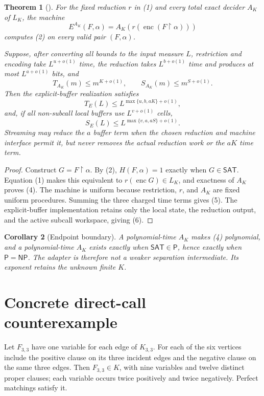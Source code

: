 \documentclass[11pt]{article}
\newtheorem{theorem}{Theorem}
\newtheorem{corollary}[theorem]{Corollary}
\newcommand{\SAT}{\mathsf{SAT}}
\newcommand{\Pclass}{\mathsf P}
\newcommand{\NPclass}{\mathsf{NP}}
\newcommand{\claim}[1]{\texttt{\detokenize{#1}}}
\begin{document}
\begin{theorem}[\claim{CORE-RESIDUAL-ADAPTER1}]
For the fixed reduction \(r\) in (1) and every total exact decider \(A_K\) of
\(L_K\), the machine
\[
 E^{A_K}(F,\alpha)
 =
 A_K\!\left(r(\operatorname{enc}(F\upharpoonright\alpha))\right) \tag{4}
\]
computes (2) on every valid pair \((F,\alpha)\).

Suppose, after converting all bounds to the input measure \(L\), restriction
and encoding take \(L^{u+o(1)}\) time, the reduction takes \(L^{b+o(1)}\)
time and produces at most \(L^{a+o(1)}\) bits, and
\[
 T_{A_K}(m)\le m^{K+o(1)},\qquad
 S_{A_K}(m)\le m^{S+o(1)}.
\]
Then the explicit-buffer realization satisfies
\[
 T_E(L)\le L^{\max\{u,b,aK\}+o(1)},                              \tag{5}
\]
and, if all non-subcall local buffers use \(L^{v+o(1)}\) cells,
\[
 S_E(L)\le L^{\max\{v,a,aS\}+o(1)}.                             \tag{6}
\]
Streaming may reduce the \(a\) buffer term when the chosen reduction and
machine interface permit it, but never removes the actual reduction work or
the \(aK\) time term.
\end{theorem}

\begin{proof}
Construct \(G=F\upharpoonright\alpha\).  By (2),
\(H(F,\alpha)=1\) exactly when \(G\in\SAT\).  Equation (1) makes this
equivalent to \(r(\operatorname{enc}G)\in L_K\), and exactness of \(A_K\)
proves (4).  The machine is uniform because restriction, \(r\), and \(A_K\)
are fixed uniform procedures.  Summing the three charged time terms gives
(5).  The explicit-buffer implementation retains only the local state,
the reduction output, and the active subcall workspace, giving (6).
\end{proof}

\begin{corollary}[Endpoint boundary]
A polynomial-time \(A_K\) makes (4) polynomial, and a polynomial-time
\(A_K\) exists exactly when \(\SAT\in\Pclass\), hence exactly when
\(\Pclass=\NPclass\).  The adapter is therefore not a weaker separation
intermediate.  Its exponent retains the unknown finite \(K\).
\end{corollary}

\section{Concrete direct-call counterexample}

Let \(F_{3,3}\) have one variable for each edge of \(K_{3,3}\).  For each of
the six vertices include the positive clause on its three incident edges and
the negative clause on the same three edges.  Then \(F_{3,3}\in K\), with
nine variables and twelve distinct proper clauses; each variable occurs twice
positively and twice negatively.  Perfect matchings satisfy it.
\end{document}
